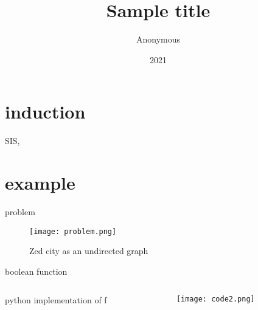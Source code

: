 \documentclass[aspectratio=1610]{beamer}
\title{Sample title}
\author{Anonymous}
\institute{Overleaf}
\date{2021}
\begin{document}
\begin{frame}[plain]
  \titlepage
\end{frame}
\section{induction}
\begin{frame}
  SIS, 
\end{frame}

\section{example}
\begin{frame}{problem}
  \begin{figure}[htbq]
    \centering
    \texttt{[image: problem.png]}
    \caption{Zed city as an undirected graph} 
    \label{fig-zed}
  \end{figure}
\end{frame}
\begin{frame}{boolean function}
  \begin{columns}
    \begin{column}{0.5\linewidth}
      \begin{block}{python implementation of f }
        
      \end{block}
    \end{column}
    \begin{column}{0.5\linewidth}
      \begin{figure}[htbq]
        \centering
        \texttt{[image: code2.png]}
      \end{figure}
    \end{column}
  \end{columns}
\end{frame}
\end{document}
